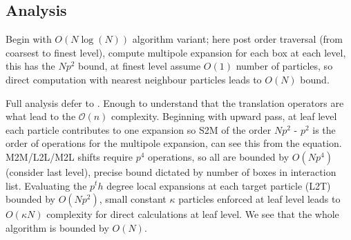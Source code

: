 \subsection{Analysis}

Begin with $O(N\log(N))$ algorithm variant; here post order traversal (from
coarsest to finest level), compute multipole expansion for each box at each level,
this has the $Np^2$ bound, at finest level assume $O(1)$ number of particles, so
direct computation with nearest neighbour particles leads to $O(N)$ bound.

Full analysis defer to \cite{Greengard:1987:Yale}. Enough to understand that the
translation operators are what lead to the $\mathcal{O}(n)$ complexity. Beginning
with upward pass, at leaf level each particle contributes to one expansion so
S2M of the order $Np^2$ - $p^2$ is the order of operations for the multipole
expansion, can see this from the equation. M2M/L2L/M2L shifts require $p^4$
operations, so all are bounded by $O(Np^4)$ (consider last level), precise bound
dictated by number of boxes in interaction list. Evaluating the $p^th$ degree
local expansions at each target particle (L2T) bounded by $O(Np^2)$, small constant
$\kappa$ particles enforced at leaf level leads to $O(\kappa N)$ complexity for
direct calculations at leaf level. We see that the whole algorithm is bounded by
$O(N)$.

\hspace{10pt}
